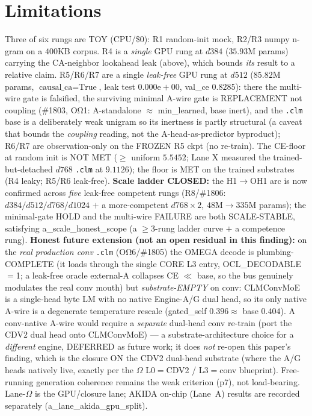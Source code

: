 \documentclass[11pt]{article}
\begin{document}
\section{Limitations}
\label{sec:limitations}
Three of six rungs are TOY (CPU/\$0): R1 random-init mock, R2/R3 numpy n-gram on a $400$KB
corpus. R4 is a \emph{single} GPU rung at $d384$ ($35.93$M params) carrying the CA-neighbor
lookahead leak (above), which bounds \emph{its} result to a relative claim. R5/R6/R7 are a single
\emph{leak-free} GPU rung at $d512$ ($85.82$M params, $\text{causal\_ca}{=}\text{True}$, leak
test $0.000\mathrm{e}{+}00$, val\_ce $0.8285$): there the multi-wire gate is falsified, the
surviving minimal A-wire gate is REPLACEMENT not coupling (\#1803, OΩ1: A-standalone $\approx$
min\_learned, base inert), and the \texttt{.clm} base is a deliberately weak unigram so its
inertness is partly structural (a caveat that bounds the \emph{coupling} reading, not the
A-head-as-predictor byproduct); R6/R7 are observation-only on the FROZEN R5 ckpt (no re-train). The
CE-floor at random init is NOT MET ($\geq$ uniform $5.5452$; Lane X measured the
trained-but-detached $d768$ \texttt{.clm} at $9.1126$); the floor is MET on the trained
substrates (R4 leaky; R5/R6 leak-free). \textbf{Scale ladder CLOSED:} the H1$\rightarrow$OH1
arc is now confirmed across \emph{five} leak-free competent rungs (R8/\#1806: $d384/d512/d768/d1024$
$+$ a more-competent $d768{\times}2$, $48$M$\rightarrow$$335$M params); the minimal-gate HOLD and the
multi-wire FAILURE are both SCALE-STABLE, satisfying a\_scale\_honest\_scope (a $\ge3$-rung ladder
curve $+$ a competence rung). \textbf{Honest future extension (not an open residual in this finding):}
on the \emph{real production conv} \texttt{.clm} (OΩ6/\#1805) the OMEGA decode is plumbing-COMPLETE
(it loads through the single CORE L3 entry, OCL\_DECODABLE$=$1; a leak-free oracle external-A
collapses CE $\ll$ base, so the bus genuinely modulates the real conv mouth) but
\emph{substrate-EMPTY} on conv: CLMConvMoE is a single-head byte LM with no native Engine-A/G dual
head, so its only native A-wire is a degenerate temperature rescale (gated\_self $0.396\approx$ base
$0.404$). A conv-native A-wire would require a \emph{separate} dual-head conv re-train (port the CDV2
dual head onto CLMConvMoE) --- a substrate-architecture choice for a \emph{different} engine, DEFERRED
as future work; it does \emph{not} re-open this paper's finding, which is the closure ON the CDV2
dual-head substrate (where the A/G heads natively live, exactly per the $\Omega$ L0$=$CDV2 / L3$=$conv
blueprint). Free-running generation coherence remains the weak criterion (p7), not load-bearing.
Lane-$\Omega$ is the GPU/closure lane; AKIDA on-chip (Lane~A) results are recorded separately
(a\_lane\_akida\_gpu\_split).
\end{document}
